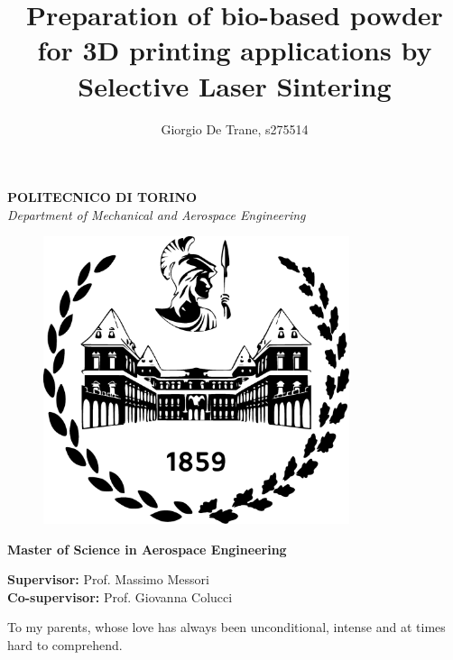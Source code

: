\documentclass{article}
\author{Giorgio De Trane, s275514}
\title{\textbf{Preparation of bio-based powder for 3D printing applications by Selective Laser Sintering}}
\begin{document}
    \setlength{\parindent}{0pt}

    \maketitle
    \begin{center}
        \textbf{POLITECNICO DI TORINO} \\ 
        \textit{Department of Mechanical and Aerospace Engineering} \\
    \end{center}

    \begin{figure}[h!]
        \centering
        \includegraphics[width=0.8\textwidth]{Pictures/polito_logo.eps}  
        \label{fig:polito_logo}      
    \end{figure}

    \begin{center} 
        \textbf{Master of Science in Aerospace Engineering} \\
    \end{center}


    \begin{center}
        \textbf{Supervisor:} Prof. Massimo Messori \\
        \textbf{Co-supervisor:} Prof. Giovanna Colucci \\
    \end{center}



    \newpage
    \begin{center}
        To my parents, whose love has always been unconditional, intense and at times hard to comprehend. 
    \end{center}
    \newpage
\end{document}
